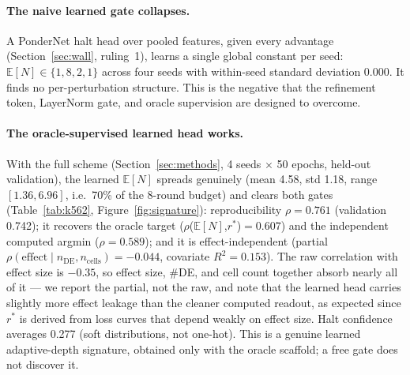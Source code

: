 \documentclass[11pt]{article}
\newcommand{\EN}{\ensuremath{\mathbb{E}[N]}}
\newcommand{\rstar}{\ensuremath{r^{\!*}}}
\let\mathrho\rho
\renewcommand{\rho}{\ensuremath{\mathrho}}
\begin{document}
\paragraph{The naive learned gate collapses.} A PonderNet halt head over pooled features, given
every advantage (Section~\ref{sec:wall}, ruling~1), learns a single global constant per seed:
$\EN{}\in\{1,8,2,1\}$ across four seeds with within-seed standard deviation $0.000$. It finds no
per-perturbation structure. This is the negative that the refinement token, LayerNorm gate, and
oracle supervision are designed to overcome.

\paragraph{The oracle-supervised learned head works.} With the full scheme
(Section~\ref{sec:methods}, 4 seeds $\times$ 50 epochs, held-out validation), the learned \EN{}
spreads genuinely (mean 4.58, std 1.18, range $[1.36, 6.96]$, i.e.\ 70\% of the 8-round budget)
and clears both gates (Table~\ref{tab:k562}, Figure~\ref{fig:signature}): reproducibility
\rho{}$=0.761$ (validation 0.742); it recovers the oracle target (\rho(\EN{},\rstar)$=0.607$) and
the independent computed argmin (\rho{}$=0.589$); and it is effect-independent (partial
$\rho(\text{effect}\mid n_{\text{DE}}, n_{\text{cells}})=-0.044$, covariate $R^2=0.153$). The raw
correlation with effect size is $-0.35$, so effect size, \#DE, and cell count together absorb
nearly all of it --- we report the partial, not the raw, and note that the learned head carries
slightly more effect leakage than the cleaner computed readout, as expected since \rstar{} is
derived from loss curves that depend weakly on effect size. Halt confidence averages 0.277 (soft
distributions, not one-hot). This is a genuine learned adaptive-depth signature, obtained only
with the oracle scaffold; a free gate does not discover it.
\end{document}
